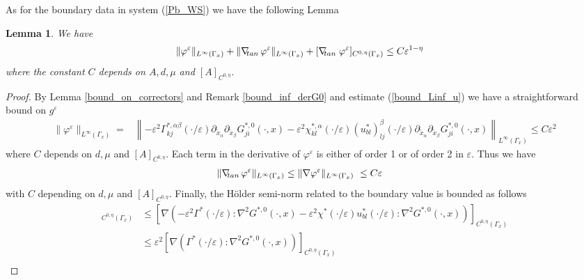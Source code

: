 \documentclass[11pt, reqno]{amsart}
\newtheorem{lemma}[theorem]{Lemma}
\theoremstyle{definition}
\theoremstyle{remark}
\numberwithin{equation}{section}
\begin{document}
	\noindent	As for the boundary data in system (\ref{Pb_WS}) we have the following Lemma
	\begin{lemma}
		We have 
		\begin{align*}
			\| \varphi^\varepsilon \|_{L^\infty(\Gamma_x)}+
			\| \nabla_{\!\!\textup{ tan}} \, \varphi^\varepsilon \|_{L^\infty(\Gamma_x)} +
			[\nabla_{\!\!\textup{ tan}}\; \varphi^\varepsilon]_{C^{0,\eta}(\Gamma_x)}  
			&\leq C \varepsilon^{1-\eta}
		\end{align*}
		where the constant $C$ depends on $A, d,\mu$ and $[A]_{C^{0,\eta}}.$
	\end{lemma}
	
	\begin{proof}
		By Lemma \ref{bound_on_correctors} and Remark \ref{bound_inf_derG0} and estimate (\ref{bound_Linf_u}) we have a straightforward bound on $	g^{\varepsilon}$
		\begin{align*}
			\|	\varphi^{\varepsilon}\|_{L^\infty(\Gamma_x)}=
			& \left\|- \varepsilon^2 \Gamma^{*,\alpha\beta}_{kj}(\cdot/\varepsilon)\partial_{\tilde{x} _{\alpha}}\partial_{\tilde{x}_{\beta}} G_{ji}^{*,0}  (\cdot,x) - \varepsilon^2	\chi^{*,\alpha}_{kl}(\cdot/\varepsilon)(u^*_{bl})^{\beta}_{lj}	(\cdot/\varepsilon)\partial_{\tilde{x} _{\alpha}}\partial_{\tilde{x}_{\beta}} G_{ji}^{*,0}  (\cdot,x)\right\|_{L^\infty(\Gamma_x)}
			\leq  C\varepsilon^2
		\end{align*}	where $C$ depends on $d,\mu$ and $[A]_{C^{0,\eta}}.$	Each term in the derivative of $	\varphi^{\varepsilon}$ is either  of order 1 or of order 2 in $\varepsilon$. 	Thus we have
		\begin{align*}
			\| \nabla_{\!\!\textup{ tan}} \, \varphi^{\varepsilon} \|_{L^\infty(\Gamma_x)} &\leq \| \nabla \varphi^{\varepsilon}  \|_{L^\infty(\Gamma_x)}\
			\leq C\varepsilon
		\end{align*}with $C$ depending on $d,\mu$ and $[A]_{C^{0,\eta}}.$		Finally, the H\"older semi-norm related to the boundary value is bounded as follows
		\begin{align*}
			[\nabla_{\!\!\textup{ tan}}\; \varphi^\varepsilon]_{C^{0,\eta}(\Gamma_x)}  &\leq    \left[\nabla \left(-\varepsilon^2\Gamma^*(\cdot/\varepsilon): \nabla^2 G^{*,0}  (\cdot,x)-\varepsilon^2\chi^* (\cdot/\varepsilon)u^*_{bl}(\cdot/\varepsilon):\nabla^2 G^{*,0}  (\cdot,x) \right) \right]_{C^{0,\eta}(\Gamma_x)}\\
			&\leq  \varepsilon^2  \left[\nabla \left(\Gamma^*(\cdot/\varepsilon): \nabla^2 G^{*,0}  (\cdot,x)\right)\right]_{C^{0,\eta}(\Gamma_x)} \\

\end{align*}
\end{proof}
\end{document}
